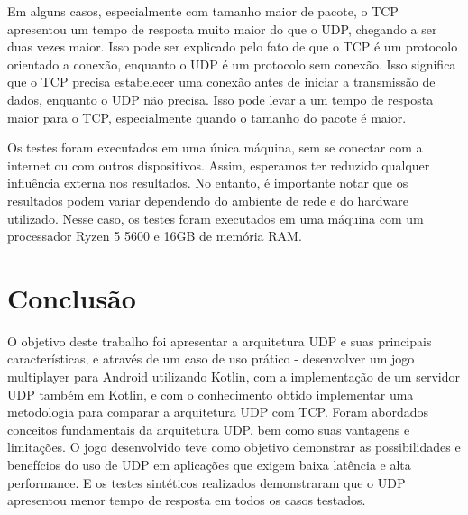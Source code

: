 \documentclass[12pt]{article}
\begin{document}
Em alguns casos, especialmente com tamanho maior de pacote, o TCP apresentou um tempo de resposta muito maior do que o UDP, chegando a ser duas vezes maior. Isso pode ser explicado pelo fato de que o TCP é um protocolo orientado a conexão, enquanto o UDP é um protocolo sem conexão. Isso significa que o TCP precisa estabelecer uma conexão antes de iniciar a transmissão de dados, enquanto o UDP não precisa. Isso pode levar a um tempo de resposta maior para o TCP, especialmente quando o tamanho do pacote é maior.

Os testes foram executados em uma única máquina, sem se conectar com a internet ou com outros dispositivos. Assim, esperamos ter reduzido qualquer influência externa nos resultados. No entanto, é importante notar que os resultados podem variar dependendo do ambiente de rede e do hardware utilizado. Nesse caso, os testes foram executados em uma máquina com um processador Ryzen 5 5600 e 16GB de memória RAM.

\section{Conclusão}
O objetivo deste trabalho foi apresentar a arquitetura UDP e suas principais características, e através de um caso de uso prático - desenvolver um jogo multiplayer para Android utilizando Kotlin, com a implementação de um servidor UDP também em Kotlin, e com o conhecimento obtido implementar uma metodologia para comparar a arquitetura UDP com TCP.
Foram abordados conceitos fundamentais da arquitetura UDP, bem como suas vantagens e limitações. O jogo desenvolvido teve como objetivo demonstrar as possibilidades e benefícios do uso de UDP em aplicações que exigem baixa latência e alta performance. E os testes sintéticos realizados demonstraram que o UDP apresentou menor tempo de resposta em todos os casos testados.






\end{document}
